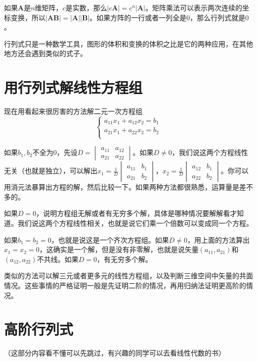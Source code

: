 如果$\mathbf{A}$是$n$维矩阵，$c$是实数，那么$|c \mathbf{A}|=c^n |\mathbf{A}|$。矩阵乘法可以表示两次连续的坐标变换，所以$|\mathbf{A} \mathbf{B}|=|\mathbf{A}| |\mathbf{B}|$。如果方阵的一行或者一列全是$0$，那么行列式就是$0$。

行列式只是一种数学工具，图形的体积和变换的体积之比是它的两种应用，在其他地方还会遇到类似的式子。
\section{用行列式解线性方程组}
现在用看起来很厉害的方法解二元一次方程组
\begin{equation*}
\begin{cases}
a_{1 1} x_1+a_{1 2} x_2=b_1 \\
a_{2 1} x_1+a_{2 2} x_2=b_2 \\
\end{cases}
\end{equation*}

如果$b_1, b_2$不全为$0$，先设$D=\begin{vmatrix}
a_{1 1} & a_{1 2} \\
a_{2 1} & a_{2 2}
\end{vmatrix}$。如果$D \neq 0$，我们说这两个方程线性无关（也就是独立），可以解出$x_1=\frac{1}{D}\begin{vmatrix}
a_{1 1} & b_1 \\
a_{2 1} & b_2
\end{vmatrix}$，$x_2=\frac{1}{D}\begin{vmatrix}
a_{1 2} & b_1 \\
a_{2 2} & b_2
\end{vmatrix}$。你可以用消元法暴算出方程的解，然后比较一下。如果两种方法都很熟悉，运算量是差不多的。

如果$D=0$，说明方程组无解或者有无穷多个解，具体是哪种情况要解解看才知道。我们说这两个方程线性相关，也就是说它们乘一个倍数可以变成同一个方程。

如果$b_1=b_2=0$，也就是说这是一个齐次方程组。如果$D \neq 0$，用上面的方法算出$x_1=x_2=0$，这确实是一个解，但是没有非零解，也就是说矢量$(a_{1 1}, a_{2 1})$和$(a_{1 2}, a_{2 2})$不共线。如果$D=0$，有无穷多个解。

类似的方法可以解三元或者更多元的线性方程组，以及判断三维空间中矢量的共面情况。这些事情的严格证明一般是先证明二阶的情况，再用归纳法证明更高阶的情况。
\section{高阶行列式}
（这部分内容看不懂可以先跳过，有兴趣的同学可以去看线性代数的书）

